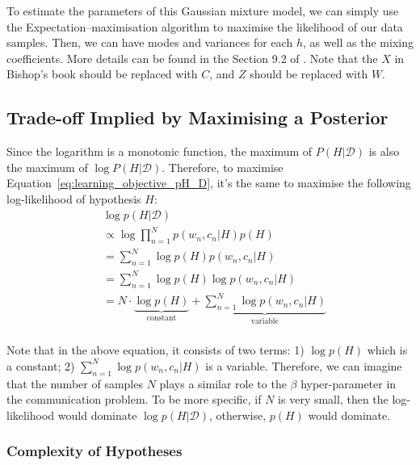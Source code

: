 \documentclass[11pt]{article}
\begin{document}
To estimate the parameters of this Gaussian mixture model, we can simply use the Expectation–maximisation algorithm\citep{EM} to maximise the likelihood of our data samples.
Then, we can have modes and variances for each $h$, as well as the mixing coefficients. 
More details can be found in the Section 9.2 of \citep{bishop2006pattern}.
Note that the $X$ in Bishop's book should be replaced with $C$, and $Z$ should be replaced with $W$.

\subsection{Trade-off Implied by Maximising a Posterior}
\label{ssec:learn_tradeoff}

Since the logarithm is a monotonic function, the maximum of $P(H|\mathcal{D})$ is also the maximum of $\log P(H|\mathcal{D})$. 
Therefore, to maximise Equation~\ref{eq:learning_objective_pH_D}, it's the same to maximise the following log-likelihood of hypothesis $H$:
\begin{align*}
        & \log p(H|\mathcal{D}) \\
        & \propto \log \prod_{n=1}^{N} p(w_n, c_n|H)p(H) \\
        &  =\sum_{n=1}^{N} \log p(H) p(w_n, c_n|H) \\
        &  =\sum_{n=1}^{N} \log p(H) \log p(w_n, c_n|H) \\
        &  =N\cdot\underbrace{\log p(H)}_{\text{constant}} + \underbrace{\sum_{n=1}^{N} \log p(w_n, c_n|H)}_{\text{variable}} \\
    \label{eq:learning_objective_log_pH_D}
\end{align*}

Note that in the above equation, it consists of two terms: 1) $\log p(H)$ which is a constant; 2) $\sum_{n=1}^{N} \log p(w_n, c_n|H)$ is a variable.
Therefore, we can imagine that the number of samples $N$ plays a similar role to the $\beta$ hyper-parameter in the communication problem. 
To be more specific, if $N$ is very small, then the log-likelihood would dominate $\log p(H|\mathcal{D})$, otherwise, $p(H)$ would dominate.

\subsubsection{Complexity of Hypotheses}
\label{ssec:learn_complexity}
\end{document}
